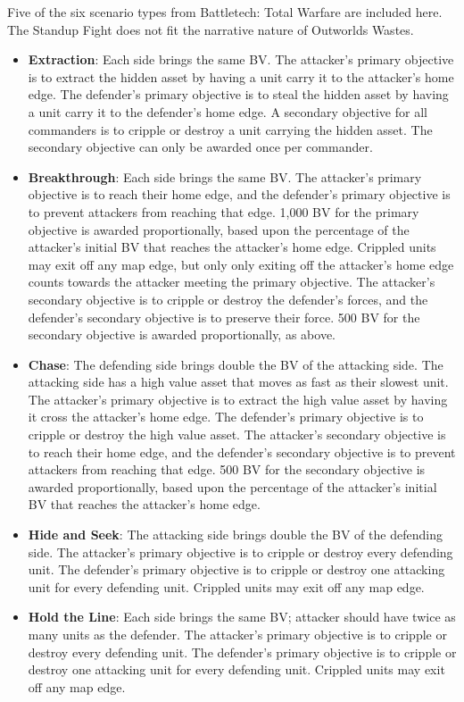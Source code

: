 \documentclass[UTF8]{article}
\begin{document}
Five of the six scenario types from Battletech: Total Warfare are included here.
The Standup Fight does not fit the narrative nature of Outworlds Wastes.\\

\begin{itemize}

\item {\bf Extraction}: Each side brings the same BV.
The attacker's primary objective is to extract the hidden asset by having a unit carry it to the attacker's home edge.
The defender's primary objective is to steal the hidden asset by having a unit carry it to the defender's home edge.
A secondary objective for all commanders is to cripple or destroy a unit carrying the hidden asset.
The secondary objective can only be awarded once per commander.

\item {\bf Breakthrough}: Each side brings the same BV.
The attacker's primary objective is to reach their home edge, and the defender's primary objective is to prevent attackers from reaching that edge.
1,000 BV for the primary objective is awarded proportionally, based upon the percentage of the attacker's initial BV that reaches the attacker's home edge.
Crippled units may exit off any map edge, but only only exiting off the attacker's home edge counts towards the attacker meeting the primary objective.
The attacker's secondary objective is to cripple or destroy the defender's forces, and the defender's secondary objective is to preserve their force.
500 BV for the secondary objective is awarded proportionally, as above. 

\item {\bf Chase}: The defending side brings double the BV of the attacking side.
The attacking side has a high value asset that moves as fast as their slowest unit.
The attacker's primary objective is to extract the high value asset by having it cross the attacker's home edge.
The defender's primary objective is to cripple or destroy the high value asset.
The attacker's secondary objective is to reach their home edge, and the defender's secondary objective is to prevent attackers from reaching that edge.
500 BV for the secondary objective is awarded proportionally, based upon the percentage of the attacker's initial BV that reaches the attacker's home edge.

\item {\bf Hide and Seek}: The attacking side brings double the BV of the defending side.
The attacker's primary objective is to cripple or destroy every defending unit.
The defender's primary objective is to cripple or destroy one attacking unit for every defending unit.
Crippled units may exit off any map edge.

\item {\bf Hold the Line}: Each side brings the same BV; attacker should have twice as many units as the defender.
The attacker's primary objective is to cripple or destroy every defending unit.
The defender's primary objective is to cripple or destroy one attacking unit for every defending unit.
Crippled units may exit off any map edge.

\end{itemize}
\end{document}
